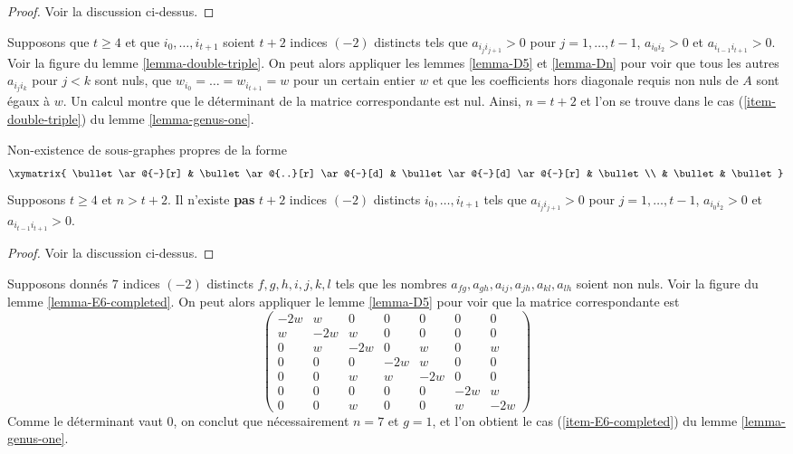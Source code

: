 \begin{proof}
Voir la discussion ci-dessus.
\end{proof}

\noindent
Supposons que $t \geq 4$ et que $i_0, \ldots, i_{t + 1}$ soient
$t + 2$ indices $(-2)$ distincts tels que
$a_{i_ji_{j + 1}} > 0$ pour $j = 1, \ldots, t - 1$,
$a_{i_0i_2} > 0$ et $a_{i_{t - 1}i_{t + 1}} > 0$.
Voir la figure du lemme \ref{lemma-double-triple}.
On peut alors appliquer les lemmes \ref{lemma-D5} et \ref{lemma-Dn}
pour voir que tous les autres $a_{i_ji_k}$ pour $j < k$ sont nuls,
que $w_{i_0} = \ldots = w_{i_{t + 1}} = w$ pour un certain
entier $w$ et que les coefficients hors diagonale requis
non nuls de $A$ sont égaux à $w$.
Un calcul montre que le déterminant de la
matrice correspondante est nul. Ainsi, $n = t + 2$
et l'on se trouve dans le cas (\ref{item-double-triple}) du
lemme \ref{lemma-genus-one}.

\begin{lemma}
\label{lemma-double-triple}
Non-existence de sous-graphes propres de la forme
$$
\xymatrix{
\bullet \ar@{-}[r] & \bullet \ar@{..}[r] \ar@{-}[d] &
\bullet \ar@{-}[d] \ar@{-}[r] & \bullet \\
& \bullet & \bullet
}
$$
Supposons $t \geq 4$ et $n > t + 2$.
Il n'existe {\bf pas} $t + 2$ indices
$(-2)$ distincts $i_0, \ldots, i_{t + 1}$ tels que
$a_{i_ji_{j + 1}} > 0$ pour $j = 1, \ldots, t - 1$,
$a_{i_0i_2} > 0$ et $a_{i_{t - 1}i_{t + 1}} > 0$.
\end{lemma}

\begin{proof}
Voir la discussion ci-dessus.
\end{proof}

\noindent
Supposons donnés $7$ indices $(-2)$ distincts
$f, g, h, i,
j, k, l$
tels que les nombres
$a_{fg}, a_{gh}, a_{ij},
a_{jh}, a_{kl}, a_{lh}$ soient non nuls.
Voir la figure du lemme \ref{lemma-E6-completed}. On peut alors appliquer le
lemme \ref{lemma-D5} pour voir que la matrice correspondante est
$$
\left(
\begin{matrix}
-2w & w & 0 & 0 & 0 & 0 & 0 \\
w & -2w & w & 0 & 0 & 0 & 0 \\
0 & w & -2w & 0 & w & 0 & w \\
0 & 0 & 0 & -2w & w & 0 & 0 \\
0 & 0 & w & w & -2w & 0 & 0 \\
0 & 0 & 0 & 0 & 0 & -2w & w \\
0 & 0 & w & 0 & 0 & w & -2w
\end{matrix}
\right)
$$
Comme le déterminant vaut $0$, on conclut que nécessairement $n = 7$
et $g = 1$, et l'on obtient le cas (\ref{item-E6-completed})
du lemme \ref{lemma-genus-one}.

